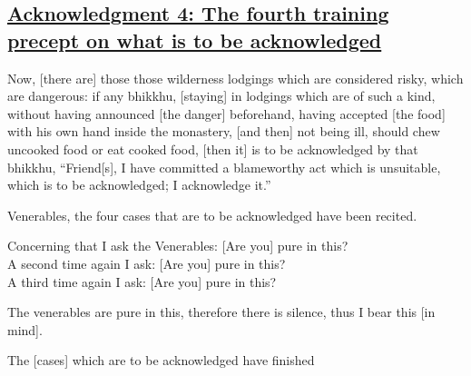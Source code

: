 \subsection*{\hyperref[pd4]{Acknowledgment 4: The fourth training precept on what is to be acknowledged}}
\label{ack4}
Now, [there are] those those wilderness lodgings which are considered risky, which are dangerous: if any bhikkhu, [staying] in lodgings which are of such a kind, without having announced [the danger] beforehand, having accepted [the food] with his own hand inside the monastery, [and then] not being ill, should chew uncooked food or eat cooked food, [then it] is to be acknowledged by that bhikkhu, ``Friend[s], I have committed a blameworthy act which is unsuitable, which is to be acknowledged; I acknowledge it.''



\medskip

\begin{center}
	Venerables, the four cases that are to be acknowledged have been recited.

	\smallskip

	Concerning that I ask the Venerables: [Are you] pure in this?\\
	A second time again I ask: [Are you] pure in this?\\
	A third time again I ask: [Are you] pure in this?

	\smallskip

	The venerables are pure in this, therefore there is silence, thus I bear this [in mind].
\end{center}

\begin{outro}
	The [cases] which are to be acknowledged have finished
\end{outro}

\clearpage

